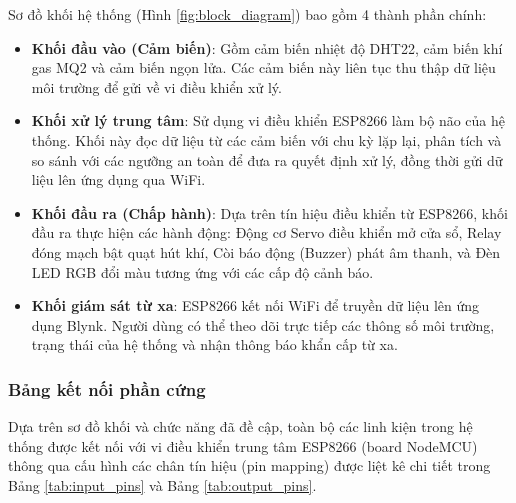 Sơ đồ khối hệ thống (Hình \ref{fig:block_diagram}) bao gồm 4 thành phần chính:
\begin{itemize}
    \item \textbf{Khối đầu vào (Cảm biến)}: Gồm cảm biến nhiệt độ DHT22, cảm biến khí gas MQ2 và cảm biến ngọn lửa. Các cảm biến này liên tục thu thập dữ liệu môi trường để gửi về vi điều khiển xử lý.
    \item \textbf{Khối xử lý trung tâm}: Sử dụng vi điều khiển ESP8266 làm bộ não của hệ thống. Khối này đọc dữ liệu từ các cảm biến với chu kỳ lặp lại, phân tích và so sánh với các ngưỡng an toàn để đưa ra quyết định xử lý, đồng thời gửi dữ liệu lên ứng dụng qua WiFi.
    \item \textbf{Khối đầu ra (Chấp hành)}: Dựa trên tín hiệu điều khiển từ ESP8266, khối đầu ra thực hiện các hành động: Động cơ Servo điều khiển mở cửa sổ, Relay đóng mạch bật quạt hút khí, Còi báo động (Buzzer) phát âm thanh, và Đèn LED RGB đổi màu tương ứng với các cấp độ cảnh báo.
    \item \textbf{Khối giám sát từ xa}: ESP8266 kết nối WiFi để truyền dữ liệu lên ứng dụng Blynk. Người dùng có thể theo dõi trực tiếp các thông số môi trường, trạng thái của hệ thống và nhận thông báo khẩn cấp từ xa.
\end{itemize}

\subsubsection{Bảng kết nối phần cứng}
Dựa trên sơ đồ khối và chức năng đã đề cập, toàn bộ các linh kiện trong hệ thống được kết nối với vi điều khiển trung tâm ESP8266 (board NodeMCU) thông qua cấu hình các chân tín hiệu (pin mapping) được liệt kê chi tiết trong Bảng \ref{tab:input_pins} và Bảng \ref{tab:output_pins}.

\begin{table}[H]
\caption{Kết nối khối cảm biến với ESP8266.}
\label{tab:input_pins}
\centering
\renewcommand{\arraystretch}{1.3}
\end{table}

